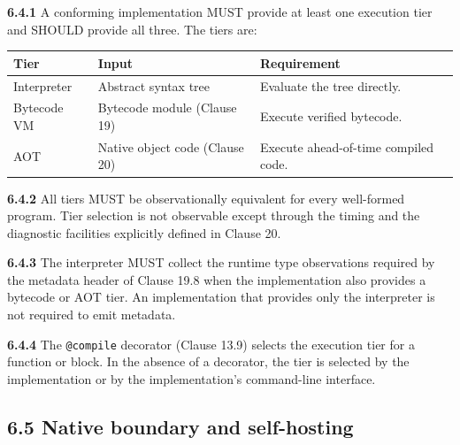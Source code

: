 \documentclass[
  english,
  11pt,
  a4paper,
]{article}
\begin{document}
\textbf{6.4.1} A conforming implementation MUST provide at least one
execution tier and SHOULD provide all three. The tiers are:

\begin{longtable}[]{@{}
  >{\raggedright\arraybackslash}p{}
  >{\raggedright\arraybackslash}p{}
  >{\raggedright\arraybackslash}p{}@{}}
\toprule\noalign{}
\begin{minipage}[b]{\linewidth}\raggedright
Tier
\end{minipage} & \begin{minipage}[b]{\linewidth}\raggedright
Input
\end{minipage} & \begin{minipage}[b]{\linewidth}\raggedright
Requirement
\end{minipage} \\
\midrule\noalign{}
\endhead
\bottomrule\noalign{}
\endlastfoot
Interpreter & Abstract syntax tree & Evaluate the tree directly. \\
Bytecode VM & Bytecode module (Clause 19) & Execute verified
bytecode. \\
AOT & Native object code (Clause 20) & Execute ahead-of-time compiled
code. \\
\end{longtable}

\textbf{6.4.2} All tiers MUST be observationally equivalent for every
well-formed program. Tier selection is not observable except through the
timing and the diagnostic facilities explicitly defined in Clause 20.

\textbf{6.4.3} The interpreter MUST collect the runtime type
observations required by the metadata header of Clause 19.8 when the
implementation also provides a bytecode or AOT tier. An implementation
that provides only the interpreter is not required to emit metadata.

\textbf{6.4.4} The \texttt{@compile} decorator (Clause 13.9) selects the
execution tier for a function or block. In the absence of a decorator,
the tier is selected by the implementation or by the implementation's
command-line interface.

\subsection{6.5 Native boundary and
self-hosting}\label{native-boundary-and-self-hosting}
\end{document}
